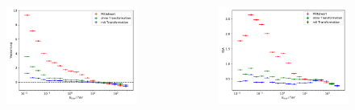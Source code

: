 \documentclass[aspectratio=1610, professionalfonts, 9pt]{beamer}
\begin{document}
  \begin{frame}
    \begin{columns}
      \begin{figure}
        \includegraphics[width=\textwidth]{pictures/trafo_nested_bias.pdf}
        \caption{}
        \label{}
      \end{figure}
      \begin{figure}
        \includegraphics[width=\textwidth]{pictures/trafo_nested_resolution.pdf}
        \caption{}
        \label{}
      \end{figure}
    \end{columns}
  \end{frame}
\end{document}
